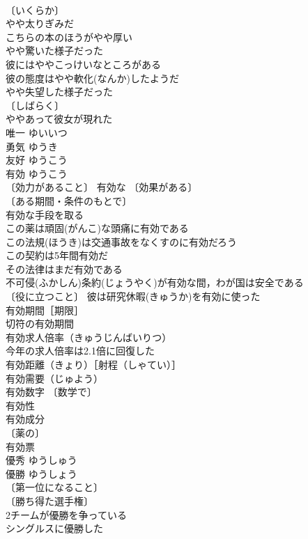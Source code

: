 \documentclass[8pt]{extreport}
\begin{document}
\begin{CJK}{UTF8}{min}
\\	〔いくらか〕
\\	やや太りぎみだ 
\\	こちらの本のほうがやや厚い 
\\	やや驚いた様子だった 
\\	彼にはややこっけいなところがある 
\\	彼の態度はやや軟化(なんか)したようだ 
\\	やや失望した様子だった 
\\	〔しばらく〕
\\	ややあって彼女が現れた 
\\	唯一	ゆいいつ	
\\	勇気	ゆうき	
\\	友好	ゆうこう	
\\	有効	ゆうこう	
\\	〔効力があること〕 有効な 〔効果がある〕
\\	〔ある期間・条件のもとで〕
\\	有効な手段を取る 
\\	この薬は頑固(がんこ)な頭痛に有効である 
\\	この法規(ほうき)は交通事故をなくすのに有効だろう 
\\	この契約は5年間有効だ 
\\	その法律はまだ有効である 
\\	不可侵(ふかしん)条約(じょうやく)が有効な間，わが国は安全である 
\\	〔役に立つこと〕 彼は研究休暇(きゅうか)を有効に使った 
\\	有効期間［期限］ 
\\	切符の有効期間 
\\	有効求人倍率（きゅうじんばいりつ） 
\\	今年の求人倍率は2.1倍に回復した 
\\	有効距離（きょり）［射程（しゃてい）］ 
\\	有効需要（じゅよう） 
\\	有効数字 〔数学で〕
\\	有効性 
\\	有効成分 
\\	〔薬の〕
\\	有効票 
\\	優秀	ゆうしゅう	
\\	優勝	ゆうしょう	
\\	〔第一位になること〕
\\	〔勝ち得た選手権〕
\\	2チームが優勝を争っている 
\\	シングルスに優勝した 

\end{CJK}
\end{document}
